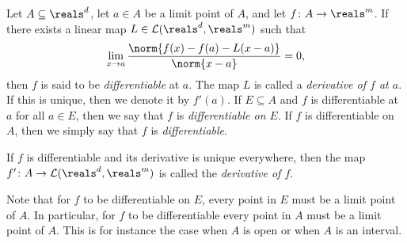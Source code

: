 \documentclass[article, a4paper, 11pt, oneside]{memoir}
\numberwithin{equation}{chapter}
\newcommand{\calL}{\mathcal{L}}
\begin{document}





\begin{definition}[Differentiability]
    \label{def:differentiability}
    Let $A \subseteq \reals^d$, let $a \in A$ be a limit point of $A$, and let $f \colon A \to \reals^m$. If there exists a linear map $L \in \calL(\reals^d, \reals^m)$ such that
    \begin{equation}
        \label{eq:differentiability-definition}
        \lim_{x \to a} \frac{\norm{f(x) - f(a) - L(x-a)}}{\norm{x - a}}
            = 0,
    \end{equation}
    then $f$ is said to be \emph{differentiable} at $a$. The map $L$ is called a \emph{derivative of $f$ at $a$}. If this is unique, then we denote it by $f'(a)$. If $E \subseteq A$ and $f$ is differentiable at $a$ for all $a \in E$, then we say that $f$ is \emph{differentiable on $E$}. If $f$ is differentiable on $A$, then we simply say that $f$ is \emph{differentiable}.
    
    If $f$ is differentiable and its derivative is unique everywhere, then the map $f' \colon A \to \calL(\reals^d,\reals^m)$ is called the \emph{derivative of $f$}.
\end{definition}
%
Note that for $f$ to be differentiable on $E$, every point in $E$ must be a limit point of $A$. In particular, for $f$ to be differentiable every point in $A$ must be a limit point of $A$. This is for instance the case when $A$ is open or when $A$ is an interval.
\end{document}
